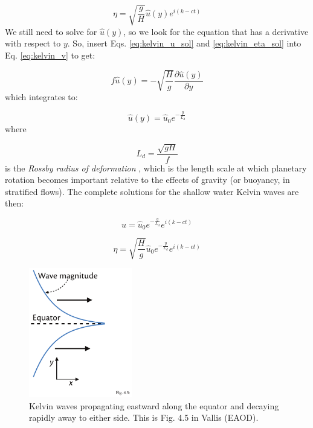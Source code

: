 \documentclass[12pt]{article}
\numberwithin{equation}{section}
\numberwithin{figure}{section}
\numberwithin{table}{section}
\begin{document}
\begin{equation}
  \eta = \sqrt{\frac{g}{H}} \widehat{u}(y) e^{i(k - c t)}
  \label{eq:kelvin_eta_sol}
\end{equation}
We still need to solve for $\widehat{u}(y)$, so we look for the equation that
has a derivative with respect to $y$.
So, insert Eqs. \ref{eq:kelvin_u_sol} and \ref{eq:kelvin_eta_sol} into Eq.
\ref{eq:kelvin_v} to get:

\begin{equation}
  f \widehat{u}(y) = - \sqrt{\frac{H}{g}} \frac{\partial \widehat{u}(y)}{\partial y}
\end{equation}
which integrates to:

\begin{equation}
  \widehat{u}(y) = \widehat{u}_0 e^{-\frac{y}{L_d}}
  \label{eq:kelvin_u_sol_y}
\end{equation}
where

\begin{equation}
  L_d = \frac{\sqrt{gH}}{f}
  \label{eq:rossby_deformation_radius}
\end{equation}
is the \textit{Rossby radius of deformation}
,
which is the length scale at which planetary rotation becomes important
relative to the effects of gravity (or buoyancy, in stratified flows).
The complete solutions for the shallow water Kelvin waves are then:

\begin{equation}
  u = \widehat{u}_0 e^{-\frac{y}{L_d}} e^{i(k - c t)}
\end{equation}

\begin{equation}
  \eta = \sqrt{\frac{H}{g}} \widehat{u}_0 e^{-\frac{y}{L_d}} e^{i(k - c t)}
\end{equation}

\begin{figure}[h]
  \centering
  \includegraphics[width=0.4\textwidth]{assets/fig_kelvin_wave.pdf}
  \caption{
    Kelvin waves propagating eastward along the equator and decaying rapidly
    away to either side.
    This is Fig. 4.5 in Vallis (EAOD).
  }
\end{figure}
\end{document}

